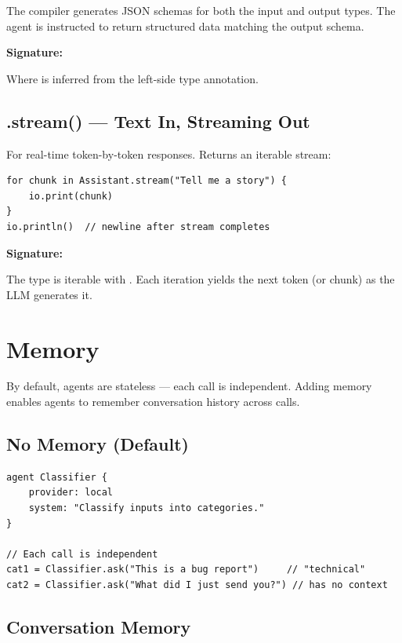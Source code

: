 The compiler generates JSON schemas for both the input and output types. The agent is instructed to return structured data matching the output schema.

\textbf{Signature:} 

Where  is inferred from the left-side type annotation.

\subsection{.stream() --- Text In, Streaming Out}

For real-time token-by-token responses. Returns an iterable stream:

\begin{lstlisting}
for chunk in Assistant.stream("Tell me a story") {
    io.print(chunk)
}
io.println()  // newline after stream completes
\end{lstlisting}

\textbf{Signature:} 

The  type is iterable with . Each iteration yields the next token (or chunk) as the LLM generates it.

\section{Memory}

By default, agents are stateless --- each call is independent. Adding memory enables agents to remember conversation history across calls.

\subsection{No Memory (Default)}

\begin{lstlisting}
agent Classifier {
    provider: local
    system: "Classify inputs into categories."
}

// Each call is independent
cat1 = Classifier.ask("This is a bug report")     // "technical"
cat2 = Classifier.ask("What did I just send you?") // has no context
\end{lstlisting}

\subsection{Conversation Memory}

